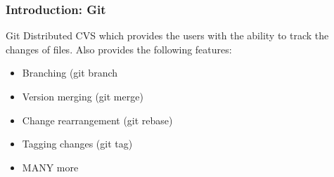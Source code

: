 \begin{frame}

\frametitle{Introduction: Git}

\begin{block}{Git}
Distributed CVS which provides the users with the ability to track the changes of files. Also provides the following features:
\begin{itemize}
\item Branching (git branch
\item Version merging (git merge)
\item Change rearrangement (git rebase)
\item Tagging changes (git tag)
\item MANY more
\end{itemize}
\end{block}

\end{frame}

